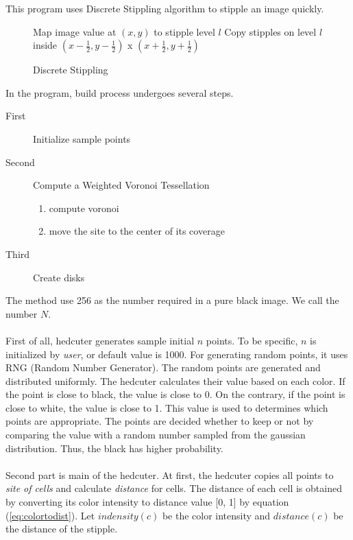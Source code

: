 \documentclass[11pt]{article}
\begin{document}
This program uses Discrete Stippling algorithm\cite{weighted-voronoi-stippling} to stipple an image quickly.

\begin{figure}[hbt]
\centering
\begin{minipage}{0.7\textwidth}

\begin{algorithm}[H]
\caption{Discrete Stippling}
\label{discretestippling}
\begin{algorithmic}

	\State Map image value at $(x, y)$ to stipple level $l$
	\State Copy stipples on level $l$ inside $(x-\frac{1}{2}, y-\frac{1}{2})$ x $(x+\frac{1}{2}, y+\frac{1}{2})$
\EndFor
\end{algorithmic}
\end{algorithm}
\end{minipage}
\end{figure}

\clearpage
In the program, build process undergoes several steps. 
\begin{description}
  \item[First] Initialize sample points
  \item[Second] Compute a Weighted Voronoi Tessellation
	\begin{enumerate}
	  \item compute voronoi
	  \item move the site to the center of its coverage
	\end{enumerate}
  \item[Third] Create disks
\end{description}
The method use 256 as the number required in a pure black image. We call the number $N$.
\\ \\
First of all, hedcuter generates sample initial $n$ points. To be specific, $n$ is initialized by \textit{user}, or default value is 1000. For generating random points, it uses RNG (Random Number Generator). The random points are generated and distributed uniformly. The hedcuter calculates their value based on each color. If the point is close to black, the value is close to 0. On the contrary, if the point is close to white, the value is close to 1. This value is used to determines which points are appropriate. The points are decided whether to keep or not by comparing the value with a random number sampled from the gaussian distribution. Thus, the black has higher probability.
\\ \\
Second part is main of the hedcuter. At first, the hedcuter copies all points to \textit{site of cells} and calculate \textit{distance} for cells. The distance of each cell is obtained by converting its color intensity to distance value [0, 1] by equation (\ref{eq:colortodist}). Let $indensity(c)$ be the color intensity and $distance(c)$ be the distance of the stipple.
\end{document}
